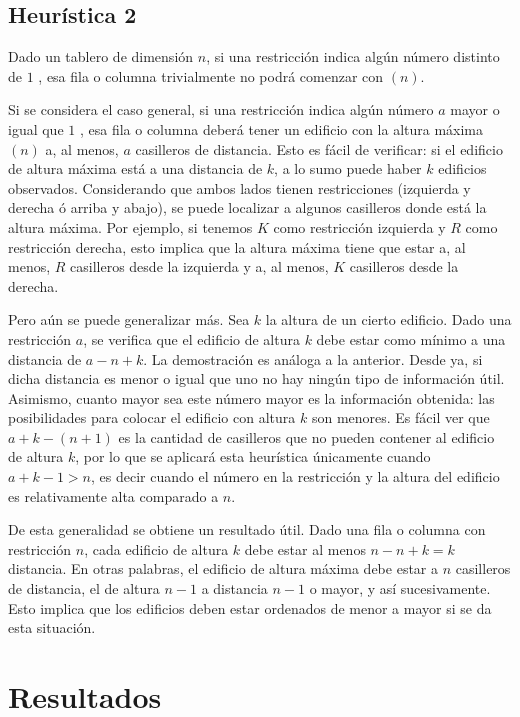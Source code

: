 \documentclass[%
    final,
    reprint,
    notitlepage,
    narroweqnarray,
    inline,
    twoside,
    invited
    ]{ieee}
\begin{document}
\subsection{Heurística 2}

\par Dado un tablero de dimensión $n$, si una restricción indica algún número distinto de $1$ , esa fila o columna trivialmente no podrá comenzar con $(n)$.
\par Si se considera el caso general, si una restricción indica algún número $a$ mayor o igual que $1$ , esa fila o columna deberá tener un edificio con la altura máxima $(n)$ a, al menos, $a$ casilleros de distancia. Esto es fácil de verificar: si 
el edificio de altura máxima está a una distancia de $k$, a lo sumo puede haber $k$ edificios observados. Considerando que ambos lados tienen restricciones (izquierda y derecha ó arriba y abajo), se puede localizar a algunos casilleros donde está la altura máxima. Por ejemplo, si tenemos $K$ como restricción izquierda y $R$ como restricción derecha, esto implica que la altura máxima tiene que estar a, al menos, $R$ casilleros desde la izquierda y a, al menos, $K$ casilleros desde la derecha.
\par Pero aún se puede generalizar más. Sea $k$ la altura de un cierto edificio. Dado una restricción $a$, se verifica que el edificio de altura $k$ debe estar como mínimo a una distancia de $a - n + k$. La demostración es análoga a la anterior. Desde ya, si dicha distancia es menor o igual que uno no hay ningún 
tipo de información útil. Asimismo, cuanto mayor sea este número mayor es la información obtenida: las posibilidades para colocar el edificio con altura $k$ son menores. 
Es fácil ver que $ a + k - (n + 1) $ es la cantidad de casilleros que no pueden contener al edificio de altura $k$, por lo que se aplicará esta heurística únicamente cuando $ a + k - 1 > n$, es decir cuando el número en la restricción y 
la altura del edificio es relativamente alta comparado a $n$. 
\par De esta generalidad se obtiene un resultado útil. Dado una fila o columna con restricción $n$, cada edificio de altura $k$ debe estar al menos $n - n + k = k$ distancia. En otras palabras, el edificio de altura máxima debe estar a $n$ casilleros de distancia, 
el de altura $n-1$ a distancia $n-1$ o mayor, y así sucesivamente. Esto implica que los edificios deben estar ordenados de menor a mayor si se da esta situación.
\section{Resultados}
\end{document}
